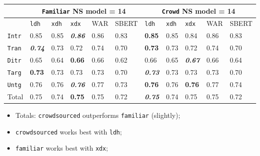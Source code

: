\documentclass[handout,xcolor={dvipsnames}]{beamer}
\newcommand{\feat}[1]{\textsc{#1}}
\newcommand{\param}[1]{\texttt{#1}}
\begin{document}
\begin{frame}
\small
\begin{table}[htb!]
\begin{center}
\setlength{\tabcolsep}{.35em}
\begin{tabular}{|l||l|l|l||l|l||l|l|l||l|l|}
\hline
 & \multicolumn{5}{c||}{\param{Fam\-il\-iar} NS model = 14} & \multicolumn{5}{c|}{\param{Crowd} NS model = 14} \\
\hline
    		& \param{ldh}	& \param{xdh} &	\param{xdx} & WAR	& {\scriptsize SBERT} & \param{ldh}	& \param{xdh} &	\param{xdx} & WAR	& {\scriptsize SBERT} \\ \hline
\hline
\param{Intr}  & 0.85                   & 0.85 & \textit{\textbf{0.86}} & 0.86 & 0.83 & \textbf{0.85}          & 0.85 & 0.84                   & 0.86 & 0.83 \\ \hline
\param{Tran}  & \textit{\textbf{0.74}} & 0.73 & 0.72                   & 0.74 & 0.70 & \textbf{0.73}          & 0.73 & 0.72                   & 0.74 & 0.70 \\ \hline
\param{Ditr}  & 0.65                   & 0.64 & \textbf{0.66}          & 0.66 & 0.62 & 0.66                   & 0.65 & \textit{\textbf{0.67}} & 0.66 & 0.64 \\ \hline
\hline
\param{Targ}  & \textbf{0.73}          & 0.73 & 0.73                   & 0.73 & 0.70 & \textit{\textbf{0.73}} & 0.73 & 0.73                   & 0.73 & 0.70 \\ \hline
\param{Untg}  & 0.76                   & 0.76 & \textit{\textbf{0.76}} & 0.77 & 0.73 & \textbf{0.76}          & 0.76 & \textbf{0.76}          & 0.77 & 0.74 \\ \hline
\hline
Total & 0.75                   & 0.74 & \textbf{0.75}          & 0.75 & 0.72 & \textit{\textbf{0.75}} & 0.74 & 0.75                   & 0.75 & 0.72 \\ \hline
\end{tabular}

\end{center}
\end{table}

\begin{itemize}
\item Totals: \param{crowdsourced} outperforms \param{familiar} (slightly);
\item \param{crowdsourced} works best with \param{ldh};
\item \param{familiar} works best with \param{xdx};
\end{itemize}

\end{frame}
\end{document}
